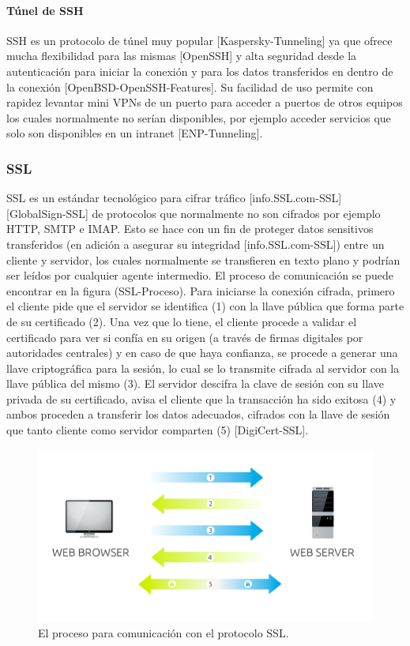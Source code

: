 \paragraph{Túnel de SSH}
SSH es un protocolo de túnel muy popular [Kaspersky-Tunneling] ya que ofrece mucha flexibilidad para las mismas [OpenSSH] y alta seguridad desde la autenticación para iniciar la conexión y para los datos transferidos en dentro de la conexión [OpenBSD-OpenSSH-Features]. Su facilidad de uso permite con rapidez levantar mini VPNs de un puerto para acceder a puertos de otros equipos los cuales normalmente no serían disponibles, por ejemplo acceder servicios que solo son disponibles en un intranet [ENP-Tunneling].

\subsubsection{SSL}
SSL es un estándar tecnológico para cifrar tráfico [info.SSL.com-SSL] [GlobalSign-SSL] de protocolos que normalmente no son cifrados por ejemplo HTTP, SMTP e IMAP. Esto se hace con un fin de proteger datos sensitivos transferidos (en adición a asegurar su integridad [info.SSL.com-SSL]) entre un cliente y servidor, los cuales normalmente se transfieren en texto plano y podrían ser leídos por cualquier agente intermedio. El proceso de comunicación se puede encontrar en la figura (SSL-Proceso). Para iniciarse la conexión cifrada, primero el cliente pide que el servidor se identifica (1) con la llave pública que forma parte de su certificado (2). Una vez que lo tiene, el cliente procede a validar el certificado para ver si confía en su origen (a través de firmas digitales por autoridades centrales) y en caso de que haya confianza, se procede a generar una llave criptográfica para la sesión, lo cual se lo transmite cifrada al servidor con la llave pública del mismo (3). El servidor descifra la clave de sesión con su llave privada de su certificado, avisa el cliente que la transacción ha sido exitosa (4) y ambos proceden a transferir los datos adecuados, cifrados con la llave de sesión que tanto cliente como servidor comparten (5) [DigiCert-SSL].

\begin{figure}
  \begin{center}
      \includegraphics[width=\textwidth]{Figures/ssl-proceso.png}
  \end{center}
  \caption{El proceso para comunicación con el protocolo SSL.} 
  \label{SSL-Proceso}
\end{figure}


